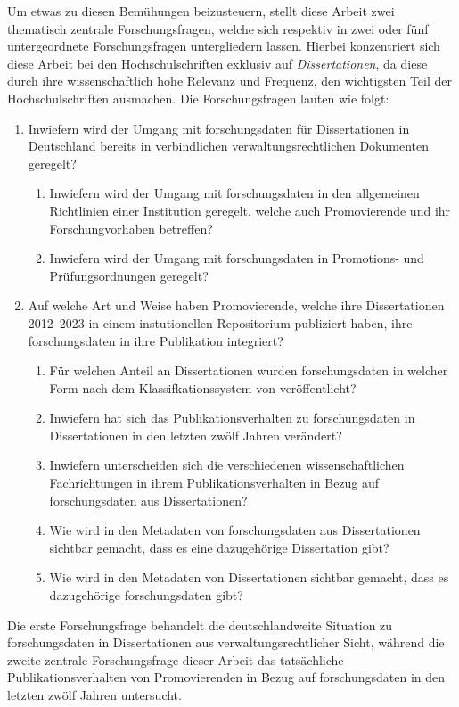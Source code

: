 Um etwas zu diesen Bemühungen beizusteuern, stellt diese Arbeit zwei thematisch zentrale Forschungsfragen, welche sich respektiv in zwei oder fünf untergeordnete Forschungsfragen untergliedern lassen.
Hierbei konzentriert sich diese Arbeit bei den Hochschulschriften exklusiv auf \textit{Dissertationen}, da diese durch ihre wissenschaftlich hohe Relevanz und Frequenz, den wichtigsten Teil der Hochschulschriften ausmachen.
Die Forschungsfragen lauten wie folgt:
\begin{enumerate}
    \item Inwiefern wird der Umgang mit \gls{forschungsdaten} für Dissertationen in Deutschland bereits in verbindlichen verwaltungsrechtlichen Dokumenten geregelt?
    \begin{enumerate}
        \item Inwiefern wird der Umgang mit \gls{forschungsdaten} in den allgemeinen Richtlinien einer Institution geregelt, welche auch Promovierende und ihr Forschungvorhaben betreffen?
        \item Inwiefern wird der Umgang mit \gls{forschungsdaten} in Promotions- und Prüfungsordnungen geregelt?
    \end{enumerate}
    \item Auf welche Art und Weise haben Promovierende, welche ihre Dissertationen 2012--2023 in einem instutionellen Repositorium publiziert haben, ihre \gls{forschungsdaten} in ihre Publikation integriert?
    \begin{enumerate}
        \item Für welchen Anteil an Dissertationen wurden \gls{forschungsdaten} in welcher Form nach dem Klassifkationssystem von \citeauthor{ReillyEtAl2011} \autocite{ReillyEtAl2011} veröffentlicht?
        \item Inwiefern hat sich das Publikationsverhalten zu \gls{forschungsdaten} in Dissertationen in den letzten zwölf Jahren verändert?
        \item Inwiefern unterscheiden sich die verschiedenen wissenschaftlichen Fachrichtungen in ihrem Publikationsverhalten in Bezug auf \gls{forschungsdaten} aus Dissertationen?
        \item Wie wird in den Metadaten von \gls{forschungsdaten} aus Dissertationen sichtbar gemacht, dass es eine dazugehörige Dissertation gibt?
        \item Wie wird in den Metadaten von Dissertationen sichtbar gemacht, dass es dazugehörige \gls{forschungsdaten} gibt?
    \end{enumerate}
\end{enumerate}
Die erste Forschungsfrage behandelt die deutschlandweite Situation zu \gls{forschungsdaten} in Dissertationen aus verwaltungsrechtlicher Sicht, während die zweite zentrale Forschungsfrage dieser Arbeit das tatsächliche Publikationsverhalten von Promovierenden in Bezug auf \gls{forschungsdaten} in den letzten zwölf Jahren untersucht.

